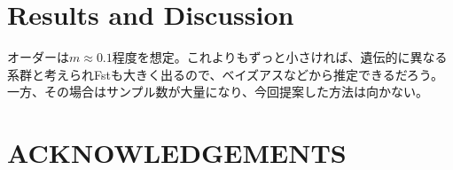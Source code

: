 \documentclass[AMA,STIX1COL]{WileyNJD-v2}
\begin{document}
\begin{comment}
今回新たに開発した移動に関する関係式について、以下の６種類の親魚に関するその子供（当歳魚）ペアがありえる：
\begin{enumerate}
  \item $N_1(t)\to N_2(t+1)$
  \item $N_1(t)\to N_2(t+2)$
  \item $N_1(t+1)\to N_2(t+2)$
  \item $N_2(t)\to N_1(t+1)$
  \item $N_2(t)\to N_1(t+2)$
  \item $N_2(t+1)\to N_1(t+2)$
\end{enumerate}
右向きの矢印$\to$は、興味ある親魚が年を跨いだ後どのサブ集団に属しているかを表している。１番目を例にとると、$t$年にサブ集団１から、$t+1$年にサブ集団２からそれぞれ当歳魚をサンプルすることを意味する。加えて、同じサブ集団から年を跨いで見つかる半兄弟ペアに基づく関係式についても、以下の６種類が考えられる：
\begin{enumerate}
\setcounter{enumi}{6}
  \item $N_1(t)\to N_1(t+1)$
  \item $N_1(t)\to N_1(t+2)$
  \item $N_1(t+1)\to N_1(t+2)$
  \item $N_2(t)\to N_2(t+1)$
  \item $N_2(t)\to N_2(t+2)$
  \item $N_2(t+1)\to N_2(t+2)$
\end{enumerate}
以上の、合計１２種類の式を連立できることを示した。最大１４個のパラメータが必要となるのであったが、パラメータ数を応用先に応じて適宜減少させることができる場合、興味あるパラメータを推定することができる。

ちなみに、同一年内に同じサブ集団内で見つかるMHSペアについては、有効集団サイズの情報（正確には有効繁殖サイズ、Effective breeding size）は持っているが、センサスサイズに関するダイレクトな情報は持っていない点に注意。
\end{comment}%

\section{Results and Discussion}\label{sec4}

オーダーは$m\approx0.1$程度を想定。これよりもずっと小さければ、遺伝的に異なる系群と考えられFstも大きく出るので、ベイズアスなどから推定できるだろう。一方、その場合はサンプル数が大量になり、今回提案した方法は向かない。

\section{ACKNOWLEDGEMENTS} 
\end{document}
